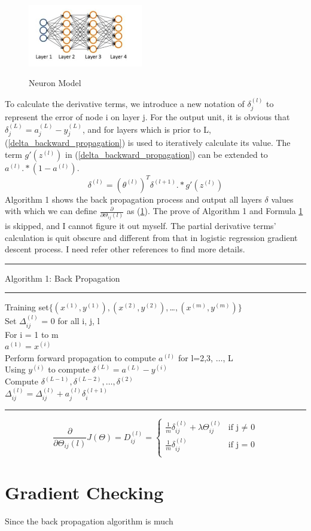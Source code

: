 \documentclass{article}
\begin{document}
\begin{figure}[ht]
  \centering
  \includegraphics[width=5cm]{Figure7.jpg}\\
  \caption{Neuron Model}\label{four_layer_neural_networks}
\end{figure}
To calculate the derivative terms, we introduce a new notation of $\delta_{j}^{(l)}$ to represent the error of node i on layer j. For the output unit, it is obvious that $\delta_{j}^{(L)} = a_{j}^{(L)} - y_{j}^{(L)}$, and for layers which is prior to L, (\ref{delta_backward_propagation}) is used to iteratively calculate its value. The term $g'(z^{(l)})$ in (\ref{delta_backward_propagation}) can be extended to $a^{(l)}.*(1-a^{(l)})$.
\begin{equation}\label{delta_backward_propagation}
\delta^{(l)} = (\theta^{(l)})^{T}\delta^{(l+1)}.*g'(z^{(l)})
\end{equation}
Algorithm 1 shows the back propagation process and output all layers $\delta$ values with which we can define $\frac{\partial}{\partial \Theta_{ij}{(l)}}$ as (\ref{}). The prove of Algorithm 1 and Formula \ref{} is skipped, and I cannot figure it out myself. The partial derivative terms' calculation is quit obscure and different from that in logistic regression gradient descent process. I need refer other references to find more details.
\smallskip
\hrule
\smallskip
Algorithm 1: Back Propagation
\smallskip
\hrule
\smallskip
Training set$\{(x^{(1)}, y^{(1)}), (x^{(2)}, y^{(2)}), $\ldots$ , (x^{(m)}, y^{(m)})\}$\\
Set $\Delta_{ij}^{(l)}$ = 0 for all i, j, l\\
For i = 1 to m\\ 
\indent $a^{(1)} = x^{(i)}$\\
\indent Perform forward propagation to compute $a^{(l)}$ for l=2,3, $\ldots$, L\\
\indent Using $y^{(i)}$ to compute $\delta^{(L)} = a^{(L)} - y^{(i)}$\\
\indent Compute $\delta^{(L-1)}, \delta^{(L-2)}, \ldots, \delta^{(2)}$\\
\indent $\Delta_{ij}^{(l)} = \Delta_{ij}^{(l)} + a_{j}^{(l)}\delta_{i}^{(l+1)}$\\
\hrule
\medskip
\begin{equation}\label{logistic_regression_example_cost_function}
\frac{\partial}{\partial \Theta_{ij}{(l)}}J(\Theta) = D_{ij}^{(l)} = \left\{ \begin{array}{ll}
\frac{1}{m}\delta_{ij}^{(l)} + \lambda \Theta_{ij}^{(l)} & \textrm{if j $\neq$ 0}\\
\frac{1}{m}\delta_{ij}^{(l)} & \textrm{if j = 0}\\
\end{array} \right.
\end{equation}

\section{Gradient Checking}
Since the back propagation algorithm is much 
\end{document}
